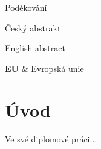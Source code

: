 \documentclass[FM,BP]{tulthesis}
\begin{document}
\begin{acknowledgement}
Poděkování
\end{acknowledgement}
\clearpage
\begin{abstractCZ}
Český abstrakt
\end{abstractCZ}
\vspace{2cm}
\begin{abstractEN}
English abstract
\end{abstractEN}
\clearpage
\tableofcontents
\pagebreak
\begin{abbrList}
\textbf{EU} & Evropská unie \\
\end{abbrList}
\chapter{Úvod}
Ve své diplomové práci...
\renewcommand{\bibname}{Seznam použité literatury}
\begin{thebibliography}{99}
\end{thebibliography}
\end{document}
